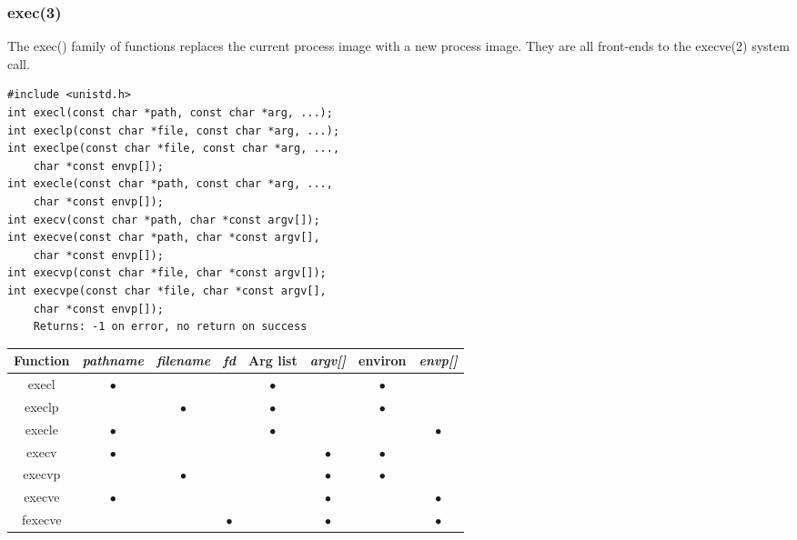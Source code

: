 \documentclass[10pt]{article}
\begin{document}
\begin{multicols}{2}
\begin{minipage}{\columnwidth}
        \subsubsection*{exec(3)}
        The exec() family of functions replaces the current process image with a new process image.
        They are all front-ends to the execve(2) system call.
        \begin{lstlisting}
#include <unistd.h>
int execl(const char *path, const char *arg, ...);
int execlp(const char *file, const char *arg, ...);
int execlpe(const char *file, const char *arg, ...,
    char *const envp[]);
int execle(const char *path, const char *arg, ...,
    char *const envp[]);
int execv(const char *path, char *const argv[]);
int execve(const char *path, char *const argv[],
    char *const envp[]);
int execvp(const char *file, char *const argv[]);
int execvpe(const char *file, char *const argv[],
    char *const envp[]);
    Returns: -1 on error, no return on success
        \end{lstlisting}
        \hspace*{-1em}
        \begin{tabular}{|c|c|c|c||c|c|c|c|}
            \hline
            Function & \textit{pathname} & \textit{filename} & \textit{fd} & Arg list  & \textit{argv[]} & \textbf{environ} & \textit{envp[]} \\
            \hline \hline
            execl    & $\bullet$         &                   &             & $\bullet$ &                 & $\bullet$        &                 \\
            execlp   &                   & $\bullet$         &             & $\bullet$ &                 & $\bullet$        &                 \\
            execle   & $\bullet$         &                   &             & $\bullet$ &                 &                  & $\bullet$       \\
            execv    & $\bullet$         &                   &             &           & $\bullet$       & $\bullet$        &                 \\
            execvp   &                   & $\bullet$         &             &           & $\bullet$       & $\bullet$        &                 \\
            execve   & $\bullet$         &                   &             &           & $\bullet$       &                  & $\bullet$       \\
            fexecve  &                   &                   & $\bullet$   &           & $\bullet$       &                  & $\bullet$       \\
            \hline
        \end{tabular}
    \end{minipage}
    \begin{minipage}{\columnwidth}

\end{minipage}
\end{multicols}
\end{document}
